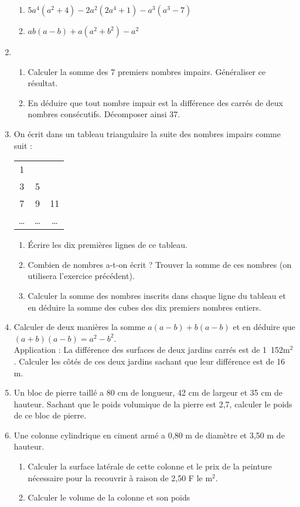\begin{enumerate}
\begin{enumerate}
\item $5a^4(a^2 + 4) - 2a^2(2a^4 + 1) - a^3(a^3 - 7)$
\item $ab(a - b) + a(a^2 + b^2) - a^2$
\end{enumerate}
\item \begin{enumerate}
\item Calculer la somme des 7 premiers nombres impairs.
Généraliser ce résultat. 
\item En déduire que tout nombre impair est la 
différence des carrés de deux nombres consécutifs.
Décomposer ainsi 37.
\end{enumerate}
\item On écrit dans un tableau triangulaire la suite des nombres impairs comme suit : 
 \begin{tabular}{ccc}
1 & & \\
3 & 5 & \\
7 & 9 & 11  \\
\ldots & \ldots & \ldots
\end{tabular}
\begin{enumerate}
\item Écrire les dix premières lignes de ce tableau.
\item Combien de nombres a-t-on écrit ? Trouver la 
somme de ces nombres (on utilisera l'exercice précédent). 
\item Calculer la somme des nombres inscrits dans 
chaque ligne du tableau et en déduire la somme des 
cubes des dix premiers nombres entiers.
\end{enumerate}
\item Calculer de deux manières la somme 
$a(a - b) + b(a - b)$ et en déduire que $(a + b)(a 
- b) = a^2 - b^2$. \\
Application : La différence des surfaces de deux 
jardins carrés est de 1~152m${}^2$. Calculer les côtés de 
ces deux jardins sachant que leur différence 
est de 16 m. 
\item Un bloc de pierre taillé a 80 cm de longueur,
42 cm de largeur et 35 cm de hauteur. Sachant que 
le poids volumique de la pierre est 2,7, calculer 
le poids de ce bloc de pierre. 
\item Une colonne cylindrique en ciment armé a 0,80 m 
de diamètre et 3,50 m de hauteur. \begin{enumerate}
\item Calculer la surface latérale de cette colonne 
et le prix de la peinture nécessaire pour la recouvrir 
à raison de 2,50 F le m${}^2$. 
\item Calculer le volume de la colonne et son poids 

\end{enumerate}
\end{enumerate}
